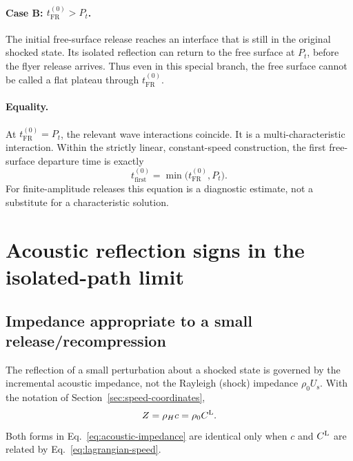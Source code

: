 \documentclass[11pt]{article}
\newcommand{\rhoz}[1][]{\rho_{0#1}}
\newcommand{\Us}[1][]{U_{\mathrm{s}#1}}
\newcommand{\tFR}{t_{\mathrm{FR}}^{(0)}}
\newcommand{\Pt}{P_t}
\begin{document}
\paragraph{Case B: $\tFR>\Pt$.}
The initial free-surface release reaches an interface that is still in the
original shocked state.  Its isolated reflection can return to the free surface
at $\Pt$, before the flyer release arrives.  Thus even in this special branch,
the free surface cannot be called a flat plateau through $\tFR$.

\paragraph{Equality.}
At $\tFR=\Pt$, the relevant wave interactions coincide.  It is a
multi-characteristic interaction.  Within the strictly linear, constant-speed
construction, the first free-surface departure time is exactly
\begin{equation}
  t_{\mathrm{first}}^{(0)}=\min\bigl(\tFR,\Pt\bigr).
  \label{eq:first-free-surface-departure}
\end{equation}
For finite-amplitude releases this equation is a diagnostic estimate, not a
substitute for a characteristic solution.

\section{Acoustic reflection signs in the isolated-path limit}

\subsection{Impedance appropriate to a small release/recompression}

The reflection of a small perturbation about a shocked state is governed by
the incremental acoustic impedance, not the Rayleigh (shock) impedance
$\rhoz\Us$.  With the notation of Section~\ref{sec:speed-coordinates},
\begin{equation}
  Z=\rho_Hc=\rhoz\CL.
  \label{eq:acoustic-impedance}
\end{equation}
Both forms in Eq.~\eqref{eq:acoustic-impedance} are identical only when
$c$ and $\CL$ are related by Eq.~\eqref{eq:lagrangian-speed}.
\end{document}
